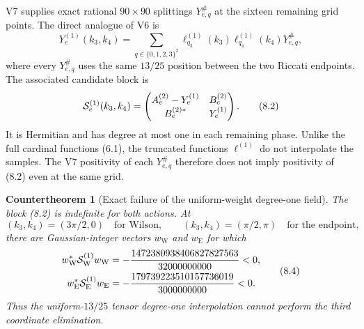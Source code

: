 \documentclass[11pt,oneside]{article}
\newtheorem{countertheorem}[theorem]{Countertheorem}
\theoremstyle{definition}
\theoremstyle{remark}
\begin{document}
V7 supplies exact rational \(90\times90\) splittings
\(Y_{e,q}^\#\) at the sixteen remaining grid points.  The direct
analogue of V6 is
\[
 Y_e^{(1)}(k_3,k_4)
 =
 \sum_{q\in\{0,1,2,3\}^2}
 \ell_{q_3}^{(1)}(k_3)\ell_{q_4}^{(1)}(k_4)Y_{e,q}^\#,
                                                               \tag{8.1}
\]
where every \(Y_{e,q}^\#\) uses the same \(13/25\) position between
the two Riccati endpoints.  The associated candidate block is
\[
 {\cal S}_e^{(1)}(k_3,k_4)
 =
 \begin{pmatrix}
 A_e^{(2)}-Y_e^{(1)}&B_e^{(2)}\\
 B_e^{(2)*}&Y_e^{(1)}
 \end{pmatrix}.                                           \tag{8.2}
\]
It is Hermitian and has degree at most one in each remaining phase.
Unlike the full cardinal functions (6.1), the truncated functions
\(\ell^{(1)}\) do not interpolate the samples.  The V7 positivity
of each \(Y_{e,q}^\#\) therefore does not imply positivity of (8.2)
even at the same grid.

\begin{countertheorem}[Exact failure of the uniform-weight degree-one field]
\label{ctr:newv8-degree-one}
The block (8.2) is indefinite for both actions.  At
\[
 (k_3,k_4)=(3\pi/2,0)\quad\text{for Wilson},\qquad
 (k_3,k_4)=(\pi/2,\pi)\quad\text{for the endpoint},        \tag{8.3}
\]
there are Gaussian-integer vectors \(w_{\mathrm W}\) and
\(w_{\mathrm E}\) for which
\[
\begin{aligned}
 w_{\mathrm W}^*{\cal S}_{\mathrm W}^{(1)}w_{\mathrm W}
 &=-\frac{1472380938406827827563}{32000000000}<0,\\
 w_{\mathrm E}^*{\cal S}_{\mathrm E}^{(1)}w_{\mathrm E}
 &=-\frac{179739223510157736019}{3000000000}<0.
\end{aligned}
\tag{8.4}
\]
Thus the uniform-\(13/25\) tensor degree-one interpolation cannot
perform the third coordinate elimination.
\end{countertheorem}
\end{document}

